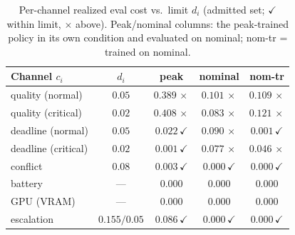 \begin{table}[t]
\centering
\caption{Per-channel realized eval cost vs.\ limit $d_i$ (admitted set;
$\checkmark$ within limit, $\times$ above). Peak/nominal columns: the
peak-trained policy in its own condition and evaluated on nominal;
nom-tr = trained on nominal.}
\label{tab:channels}
\footnotesize
\setlength{\tabcolsep}{4pt}
\begin{tabular}{@{}lcccc@{}}
\toprule
Channel $c_i$ & $d_i$ & peak & nominal & nom-tr \\
\midrule
quality (normal)   & $0.05$ & $0.389\,\times$ & $0.101\,\times$ & $0.109\,\times$ \\
quality (critical) & $0.02$ & $0.408\,\times$ & $0.083\,\times$ & $0.121\,\times$ \\
deadline (normal)  & $0.05$ & $0.022\,\checkmark$ & $0.090\,\times$ & $0.001\,\checkmark$ \\
deadline (critical)& $0.02$ & $0.001\,\checkmark$ & $0.077\,\times$ & $0.046\,\times$ \\
conflict           & $0.08$ & $0.003\,\checkmark$ & $0.000\,\checkmark$ & $0.000\,\checkmark$ \\
battery            & ---    & $0.000$ & $0.000$ & $0.000$ \\
GPU (VRAM)         & ---    & $0.000$ & $0.000$ & $0.000$ \\
escalation         & $0.155/0.05$ & $0.086\,\checkmark$ & $0.000\,\checkmark$ & $0.000\,\checkmark$ \\
\bottomrule
\end{tabular}
\end{table}

